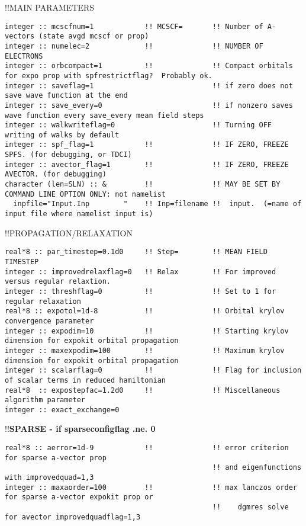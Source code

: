 !!{\large \quad MAIN PARAMETERS }
\begin{verbatim}
integer :: mcscfnum=1            !! MCSCF=       !! Number of A-vectors (state avgd mcscf or prop)
integer :: numelec=2             !!              !! NUMBER OF ELECTRONS
integer :: orbcompact=1          !!              !! Compact orbitals for expo prop with spfrestrictflag?  Probably ok.
integer :: saveflag=1                            !! if zero does not save wave function at the end
integer :: save_every=0                          !! if nonzero saves wave function every save_every mean field steps
integer :: walkwriteflag=0                       !! Turning OFF writing of walks by default
integer :: spf_flag=1            !!              !! IF ZERO, FREEZE SPFS. (for debugging, or TDCI)
integer :: avector_flag=1        !!              !! IF ZERO, FREEZE AVECTOR. (for debugging)
character (len=SLN) :: &         !!              !! MAY BE SET BY COMMAND LINE OPTION ONLY: not namelist
  inpfile="Input.Inp        "    !! Inp=filename !!  input.  (=name of input file where namelist input is)
\end{verbatim}
!!{\large \quad PROPAGATION/RELAXATION}
\begin{verbatim}
real*8 :: par_timestep=0.1d0     !! Step=        !! MEAN FIELD TIMESTEP
integer :: improvedrelaxflag=0   !! Relax        !! For improved versus regular relaxtion.   
integer :: threshflag=0          !!              !! Set to 1 for regular relaxation
real*8 :: expotol=1d-8           !!              !! Orbital krylov convergence parameter
integer :: expodim=10            !!              !! Starting krylov dimension for expokit orbital propagation
integer :: maxexpodim=100        !!              !! Maximum krylov dimension for expokit orbital propagation
integer :: scalarflag=0          !!              !! Flag for inclusion of scalar terms in reduced hamiltonian
real*8  :: expostepfac=1.2d0     !!              !! Miscellaneous algorithm parameter
integer :: exact_exchange=0
\end{verbatim}
!!\textbf{\qquad SPARSE - if sparseconfigflag .ne. 0}
\begin{verbatim}
real*8 :: aerror=1d-9            !!              !! error criterion for sparse a-vector prop
                                                 !! and eigenfunctions with improvedquad=1,3
integer :: maxaorder=100         !!              !! max lanczos order for sparse a-vector expokit prop or
                                                 !!    dgmres solve for avector improvedquadflag=1,3
\end{verbatim}
